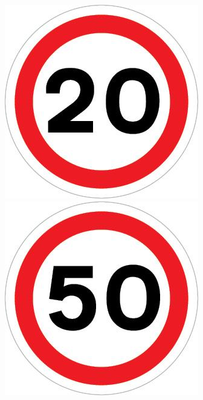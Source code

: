 \documentclass[a4paper]{report}
\begin{document}
\begin{figure}[!htb]
  \includegraphics[width=\linewidth]{images/new_20_2.jpg}
\endminipage\hfill
{}
  \includegraphics[width=\linewidth]{images/new_50_1.jpg}

\end{figure}
\end{document}
